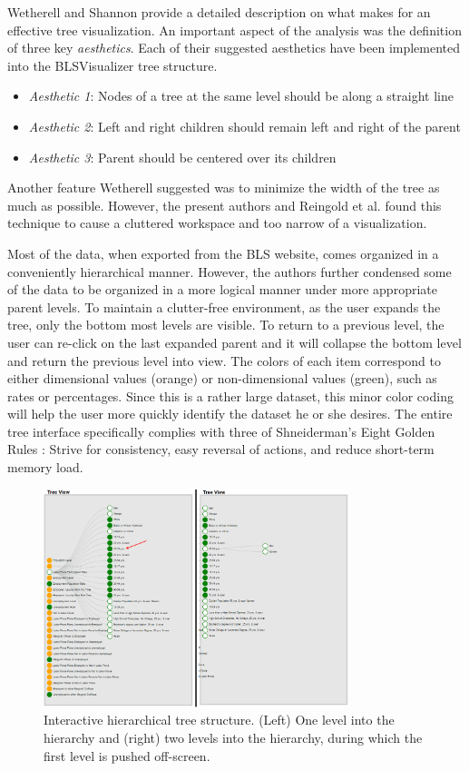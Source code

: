 \documentclass{sigchi}
\begin{document}
{Wetherell and Shannon \cite{Wetherell1979} provide a detailed description on what makes for an effective tree visualization. An important aspect of the analysis was the definition of three key \textit{aesthetics}. Each of their suggested aesthetics have been implemented into the BLSVisualizer tree structure.
\begin{itemize}
\item \textit{Aesthetic 1}: Nodes of a tree at the same level should be along a straight line
\item \textit{Aesthetic 2}: Left and right children should remain left and right of the parent
\item \textit{Aesthetic 3}: Parent should be centered over its children
\end{itemize}

Another feature Wetherell suggested was to minimize the width of the tree as much as possible. However, the present authors and Reingold et al. \cite{Reingold1981} found this technique to cause a cluttered workspace and too narrow of a visualization.

Most of the data, when exported from the BLS website, comes organized in a conveniently hierarchical manner. However, the authors further condensed some of the data to be organized in a more logical manner under more appropriate parent levels. To maintain a clutter-free environment, as the user expands the tree, only the bottom most levels are visible. To return to a previous level, the user can re-click on the last expanded parent and it will collapse the bottom level and return the previous level into view. The colors of each item correspond to either dimensional values (orange) or non-dimensional values (green), such as rates or percentages. Since this is a rather large dataset, this minor color coding will help the user more quickly identify the dataset he or she desires. The entire tree interface specifically complies with three of Shneiderman's Eight Golden Rules \cite{shneiderman1986}: Strive for consistency, easy reversal of actions, and reduce short-term memory load.

\begin{figure}[t]
\centering
    \includegraphics[width = 3.5in]{figures/tree2.png}
    \caption{Interactive hierarchical tree structure. (Left) One level into the hierarchy and (right) two levels into the hierarchy, during which the first level is pushed off-screen.}
    \label{TreeStructure}
\end{figure}

}
\end{document}
